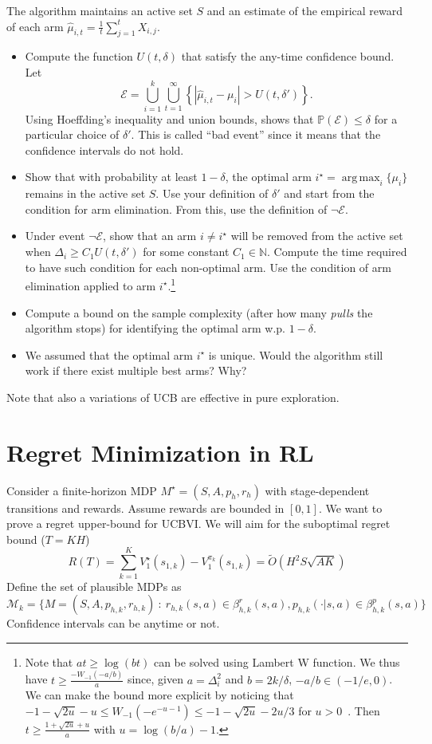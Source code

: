 \documentclass[a4paper]{article}
\newcommand{\wh}[1]{\widehat{#1}}
\newcommand{\wt}[1]{\widetilde{#1}}
\DeclareMathOperator*{\argmax}{\arg\,\max}
\begin{document}
The algorithm maintains an active set $S$ and an estimate of the empirical reward of each arm $\wh\mu_{i,t} = \frac{1}{t} \sum_{j=1}^t X_{i,j}$.
\begin{itemize}
    \item Compute the function $U(t,\delta)$ that satisfy the any-time confidence bound. Let 
    \[ 
        \mathcal{E} = \bigcup_{i=1}^{k}\bigcup_{t=1}^{\infty} \left\{ | \wh{\mu}_{i,t} - \mu_i | > U(t,\delta')\right\}.
    \]
    Using Hoeffding's inequality and union bounds, shows that $\mathbb{P}(\mathcal{E}) \leq \delta$ for a particular choice of $\delta'$. This is called ``bad event'' since it means that the confidence intervals do not hold.
    \item Show that with probability at least $1-\delta$, the optimal arm $i^\star =\argmax_i \{\mu_{i}\}$ remains in the active set $S$. Use your definition of $\delta'$ and start from the condition for arm elimination. From this, use the definition of $\neg \mathcal{E}$.
    \item Under event $\neg \mathcal{E}$, show that an arm $i \neq i^\star$ will be removed from the active set when $\Delta_i \geq C_1 U(t, \delta')$ for some constant $C_1 \in \mathbb{N}$. Compute the time required to have such condition for each non-optimal arm. Use the condition of arm elimination applied to arm $i^\star$.\footnote{Note that $at \geq \log(bt)$ can be solved using Lambert W function. We thus have $t \geq \frac{-W_{-1}(-a/b)}{a}$ since, given $a = \Delta^2_i$ and $b=2k/\delta$, $-a/b \in (-1/e,0)$. We can make the bound more explicit by noticing that $-1-\sqrt{2u}-u\leq W_{-1}(-e^{-u-1})\leq -1 - \sqrt{2u} - 2u/3$ for $u>0$~\citep{Chatzigeorgiou16}. Then $t \geq \frac{1+\sqrt{2u}+u}{a}$ with $u=\log(b/a) - 1$.}
    \item Compute a bound on the sample complexity (after how many \emph{pulls} the algorithm stops) for identifying the optimal arm w.p. $1-\delta$. 
    \item We assumed that the optimal arm $i^\star$ is unique. Would the algorithm still work if there exist multiple best arms? Why?
\end{itemize}

Note that also a variations of UCB are effective in pure exploration.


\section{Regret Minimization in RL}
Consider a finite-horizon MDP $M^\star = (S, A, p_h, r_h)$ with stage-dependent transitions and rewards. Assume rewards are bounded in $[0,1]$.
We want to prove a regret upper-bound for UCBVI. We will aim for the suboptimal regret bound ($T=KH$)
\[
    R(T) = \sum_{k=1}^K V^\star_1(s_{1,k}) - V^{\pi_k}_1(s_{1,k}) = \wt{O}(H^2S\sqrt{AK})
\]
Define the set of plausible MDPs as 
\[
    \mathcal{M}_k = \{ M = (S,A, p_{h,k}, r_{h,k}) ~:~ r_{h,k}(s,a) \in \beta^r_{h,k}(s,a), p_{h,k}(\cdot|s,a) \in \beta^p_{h,k}(s,a)  \}
\]
Confidence intervals can be anytime or not.
\end{document}
